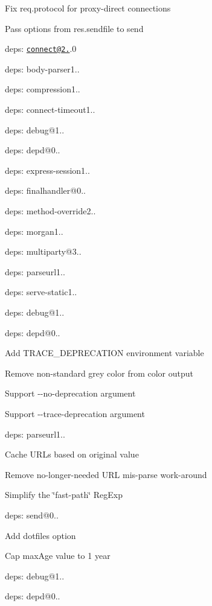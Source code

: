 {\ttfamily 
\begin{DoxyItemize}
\item Fix {\ttfamily req.\+protocol} for proxy-\/direct connections
\item Pass options from {\ttfamily res.\+sendfile} to {\ttfamily send}
\item deps\+: \href{mailto:connect@2.24}{\tt connect@2.}.0
\begin{DoxyItemize}
\item deps\+: body-\/parser1..
\item deps\+: compression1..
\item deps\+: connect-\/timeout1..
\item deps\+: debug@1..
\item deps\+: depd@0..
\item deps\+: express-\/session1..
\item deps\+: finalhandler@0..
\item deps\+: method-\/override2..
\item deps\+: morgan1..
\item deps\+: multiparty@3..
\item deps\+: parseurl1..
\item deps\+: serve-\/static1..
\end{DoxyItemize}
\item deps\+: debug@1..
\item deps\+: depd@0..
\begin{DoxyItemize}
\item Add {\ttfamily T\+R\+A\+C\+E\+\_\+\+D\+E\+P\+R\+E\+C\+A\+T\+I\+ON} environment variable
\item Remove non-\/standard grey color from color output
\item Support {\ttfamily -\/-\/no-\/deprecation} argument
\item Support {\ttfamily -\/-\/trace-\/deprecation} argument
\end{DoxyItemize}
\item deps\+: parseurl1..
\begin{DoxyItemize}
\item Cache U\+R\+Ls based on original value
\item Remove no-\/longer-\/needed U\+RL mis-\/parse work-\/around
\item Simplify the \char`\"{}fast-\/path\char`\"{} {\ttfamily Reg\+Exp}
\end{DoxyItemize}
\item deps\+: send@0..
\begin{DoxyItemize}
\item Add {\ttfamily dotfiles} option
\item Cap {\ttfamily max\+Age} value to 1 year
\item deps\+: debug@1..
\item deps\+: depd@0..
\end{DoxyItemize}
\end{DoxyItemize}}

